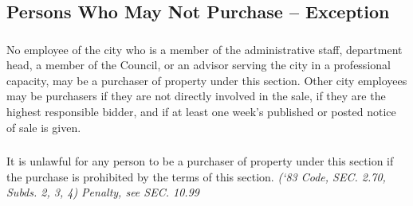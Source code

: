 \subsection{Persons Who May Not Purchase -- Exception}
\subsubsection{}
No employee of the city who is a member of the administrative staff, department head, a member of the Council, or an advisor serving the city in a professional capacity, may be a purchaser of property under this section.  Other city employees may be purchasers if they are not directly involved in the sale, if they are the highest responsible bidder, and if at least one week’s published or posted notice of sale is given.
\subsubsection{}
It is unlawful for any person to be a purchaser of property under this section if the purchase is prohibited by the terms of this section.\newline
\emph{(‘83 Code, SEC. 2.70, Subds. 2, 3, 4) Penalty, see SEC. 10.99}


%
